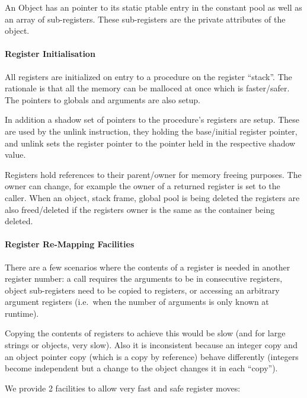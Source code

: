 An Object has an pointer to its static ptable entry in the constant pool
as well as an array of sub-registers. These sub-registers are the
private attributes of the object.

\hypertarget{register-initialisation}{%
\paragraph{Register Initialisation}\label{register-initialisation}}

All registers are initialized on entry to a procedure on the register
``stack''. The rationale is that all the memory can be malloced at once
which is faster/safer. The pointers to globals and arguments are also
setup.

In addition a shadow set of pointers to the procedure's registers are
setup. These are used by the unlink instruction, they holding the
base/initial register pointer, and unlink sets the register pointer to
the pointer held in the respective shadow value.

Registers hold references to their parent/owner for memory freeing
purposes. The owner can change, for example the owner of a returned
register is set to the caller. When an object, stack frame, global pool
is being deleted the registers are also freed/deleted if the registers
owner is the same as the container being deleted.

\hypertarget{register-re-mapping-facilities}{%
\paragraph{Register Re-Mapping
Facilities}\label{register-re-mapping-facilities}}

There are a few scenarios where the contents of a register is needed in
another register number: a call requires the arguments to be in
consecutive registers, object sub-registers need to be copied to
registers, or accessing an arbitrary argument registers (i.e.~when the
number of arguments is only known at runtime).

Copying the contents of registers to achieve this would be slow (and for
large strings or objects, very slow). Also it is inconsistent because an
integer copy and an object pointer copy (which is a copy by reference)
behave differently (integers become independent but a change to the
object changes it in each ``copy'').

We provide 2 facilities to allow very fast and safe register moves:

